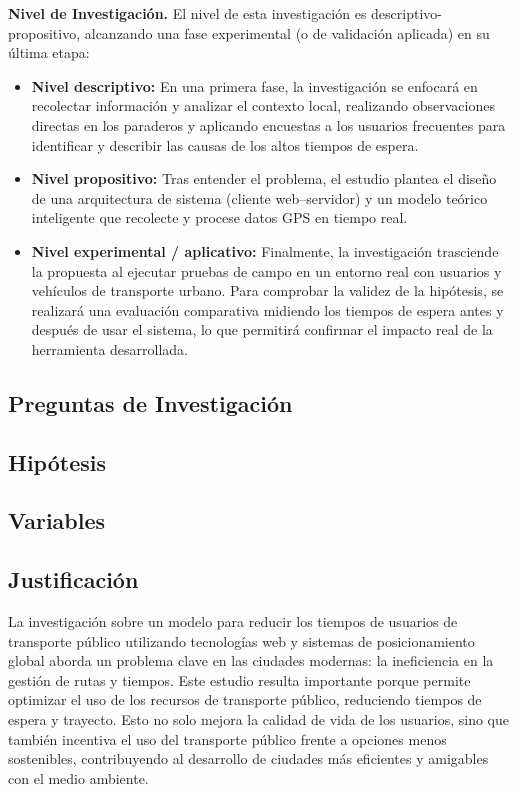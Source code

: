 \textbf{Nivel de Investigación.} El nivel de esta investigación es descriptivo-propositivo, alcanzando una fase experimental (o de validación aplicada) en su última etapa:

\begin{itemize}
    \item \textbf{Nivel descriptivo:} En una primera fase, la investigación se enfocará en recolectar información y analizar el contexto local, realizando observaciones directas en los paraderos y aplicando encuestas a los usuarios frecuentes para identificar y describir las causas de los altos tiempos de espera.
    \item \textbf{Nivel propositivo:} Tras entender el problema, el estudio plantea el diseño de una arquitectura de sistema (cliente web--servidor) y un modelo teórico inteligente que recolecte y procese datos GPS en tiempo real.
    \item \textbf{Nivel experimental / aplicativo:} Finalmente, la investigación trasciende la propuesta al ejecutar pruebas de campo en un entorno real con usuarios y vehículos de transporte urbano. Para comprobar la validez de la hipótesis, se realizará una evaluación comparativa midiendo los tiempos de espera antes y después de usar el sistema, lo que permitirá confirmar el impacto real de la herramienta desarrollada.
\end{itemize}

\subsection{Preguntas de Investigación}

\subsection{Hipótesis}

\subsection{Variables}

\subsection{Justificación}

La investigación sobre un modelo para reducir los tiempos de usuarios de transporte público utilizando tecnologías web y sistemas de posicionamiento global aborda un problema clave en las ciudades modernas: la ineficiencia en la gestión de rutas y tiempos. Este estudio resulta importante porque permite optimizar el uso de los recursos de transporte público, reduciendo tiempos de espera y trayecto. Esto no solo mejora la calidad de vida de los usuarios, sino que también incentiva el uso del transporte público frente a opciones menos sostenibles, contribuyendo al desarrollo de ciudades más eficientes y amigables con el medio ambiente.


